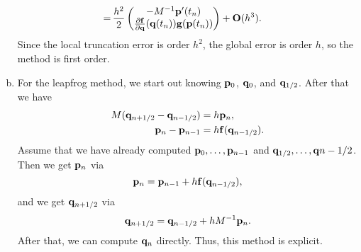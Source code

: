 \begin{solution}
\begin{enumerate}[(a)]
\begin{align*}
      =\, & \frac{h^2}{2}
      \begin{pmatrix}
        -M^{-1} \mathbf{p}'(t_n) \\
        \frac{\partial \mathbf{f}}{\partial \mathbf{q}}(\mathbf{q}(t_n))\mathbf{g}(\mathbf{p}(t_n))
      \end{pmatrix}
      + \mathbf{O}(h^3).
    \end{align*}
    Since the local truncation error is order $h^2$, the global error is order $h$, so the method is first order.
    \item For the leapfrog method, we start out knowing $\mathbf{p}_0$, $\mathbf{q}_0$, and $\mathbf{q}_{1/2}$. After that we have
    \begin{align*}
      M(\mathbf{q}_{n+1/2} - \mathbf{q}_{n-1/2}) &= h \mathbf{p}_n, \\
      \mathbf{p}_n - \mathbf{p}_{n-1} &= h \mathbf{f}(\mathbf{q}_{n-1/2}).
    \end{align*}
    Assume that we have already computed $\mathbf{p}_0, \dots, \mathbf{p}_{n-1}$ and $\mathbf{q}_{1/2}, \dots, \mathbf{q}{n-1/2}$. Then we get $\mathbf{p}_n$ via 
    \[
      \mathbf{p}_n = \mathbf{p}_{n-1} + h \mathbf{f}(\mathbf{q}_{n-1/2}),
    \]
    and we get $\mathbf{q}_{n+1/2}$ via
    \[
      \mathbf{q}_{n+1/2} = \mathbf{q}_{n-1/2} + h M^{-1} \mathbf{p}_n.
    \]
    After that, we can compute $\mathbf{q}_n$ directly. Thus, this method is explicit.
    

\end{enumerate}
\end{solution}
